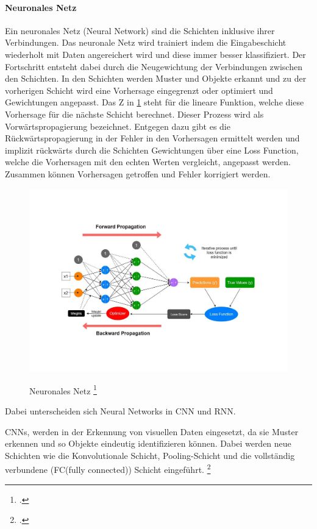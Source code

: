 \paragraph{Neuronales Netz}
Ein neuronales Netz (Neural Network) sind die Schichten inklusive ihrer Verbindungen.
Das neuronale Netz wird trainiert indem die Eingabeschicht 
wiederholt mit Daten angereichert wird und diese immer besser klassifiziert.
Der Fortschritt entsteht dabei durch die Neugewichtung der Verbindungen 
zwischen den Schichten. 
In den Schichten werden Muster und Objekte erkannt und zu der vorherigen Schicht
wird eine Vorhersage eingegrenzt oder optimiert 
und Gewichtungen angepasst. 
Das Z in \ref{fig:NN} steht für die lineare Funktion, 
welche diese Vorhersage für die nächste Schicht berechnet.
Dieser Prozess wird als 
Vorwärtspropagierung bezeichnet. 
Entgegen dazu gibt es die Rückwärtspropagierung 
in der Fehler in den Vorhersagen ermittelt werden 
und implizit rückwärts durch die Schichten 
Gewichtungen über eine Loss Function, 
welche die Vorhersagen mit den echten Werten vergleicht, 
angepasst werden. 
Zusammen können Vorhersagen getroffen und Fehler korrigiert werden.
\begin{figure}[htb]
    \centering
    \includegraphics[width=\textwidth]{img/NeuralNetwork.pdf}\\
    \caption{ Neuronales Netz \footcite{pramodithaOverviewNeuralNetwork2022a}}\label{fig:NN}
\end{figure}

  
Dabei unterscheiden sich Neural Networks in 
\gls{CNN} und \gls{RNN}.

CNNs, 
werden in der Erkennung von visuellen Daten eingesetzt, 
da sie Muster erkennen und so Objekte eindeutig identifizieren können.
Dabei werden neue Schichten wie die Konvolutionale Schicht, Pooling-Schicht und
die vollständig verbundene (FC(fully connected)) Schicht eingeführt. 
\footcite{WasSindKonvolutionale2021}


